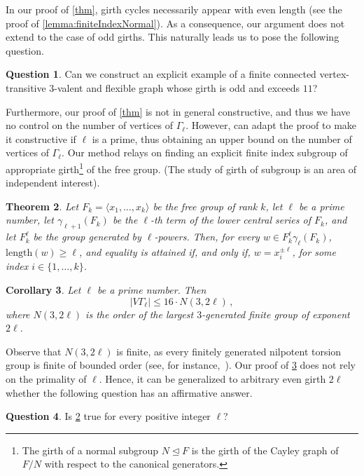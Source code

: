 \documentclass[a4paper]{amsart}
\newcommand{\len}{\mathrm{length}}
\newcommand{\0}{\mathbf{0}}
\newtheorem{thmx}{Theorem}[]
\newtheorem{corx}[thmx]{Corollary}
\theoremstyle{definition}
\newtheorem{question}[thmx]{Question}
\begin{document}
In our proof of \cref{thm}, girth cycles necessarily appear with even length (see the proof of \cref{lemma:finiteIndexNormal}). As a consequence, our argument does not extend to the case of odd girths. This naturally leads us to pose the following question.
\begin{question}
    Can we construct an explicit example of a finite connected vertex-transitive $3$-valent and flexible graph whose girth is odd and exceeds $11$?
\end{question}
    
Furthermore, our proof of \cref{thm} is not in general constructive, and thus we have no control on the number of vertices of $\Gamma_\ell$. However, can adapt the proof to make it constructive if $\ell$ is a prime, thus obtaining an upper bound on the number of vertices of $\Gamma_\ell$. Our method relays on finding an explicit finite index subgroup of appropriate girth\footnote{The girth of a normal subgroup $N \unlhd F$ is the girth of the Cayley graph of $F/N$ with respect to the canonical generators.} of the free group. (The study of girth of subgroup is an area of independent interest). %

\begin{thmx}
\label{cor: p-power-nilpotent}
    Let $F_k = \langle x_1, \dots, x_k \rangle $ be the free group of rank $k$, let $\ell$ be a prime number, let $\gamma_{\ell+1}(F_k)$ be the $\ell$-th term of the lower central series of $F_k$, and let $F_k^\ell$ be the group generated by $\ell$-powers. Then, for every $w \in F_k^\ell \gamma_{\ell}(F_k)$, $\len(w) \geq \ell$, and equality is attained if, and only if, $w = x_{i}^{\pm \ell}$, for some index $i \in \{ 1, \dots, k \}$.
\end{thmx}
\begin{corx}
\label{prop:bounds}
    Let $\ell$ be a prime number. Then
    \[ |V\Gamma_\ell| \le 16 \cdot N\left(3,2\ell\right) \,,\]
    where $N(3,2\ell)$ is the order of the largest $3$-generated finite group of exponent $2\ell$.
\end{corx}
Observe that $N(3,2\ell)$ is finite, as every finitely generated nilpotent torsion group is finite of bounded order (see, for instance,~\cite[Lemma~2.34]{CeSi}). Our proof of \cref{prop:bounds} does not rely on the primality of $\ell$. Hence, it can be generalized to arbitrary even girth $2\ell$ whether the following question has an affirmative answer.
\begin{question}
\label{question: general}
    Is \cref{cor: p-power-nilpotent} true for every positive integer $\ell$?
\end{question}
\end{document}
